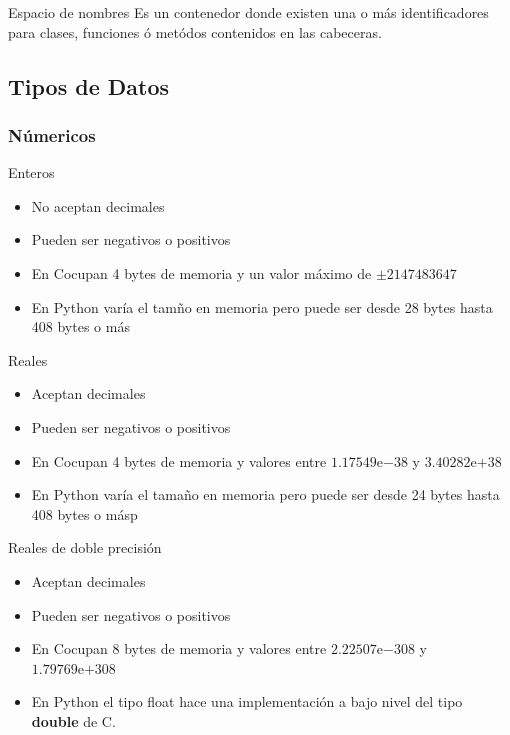 \documentclass{beamer}
\newcommand{\Rplus}{\protect\hspace{-.1em}\protect\raisebox{.35ex}{\smaller{\smaller\textbf{+}}}}
\newcommand{\Cpp}{\mbox{C\Rplus\Rplus}\hspace{3pt}}
\newcommand{\expnumber}[2]{{#1}\mathrm{e}{#2}}
\begin{document}
\begin{frame}{Espacio de nombres}
	Es un contenedor donde existen una o m\'as identificadores para clases, funciones \'o met\'odos contenidos en las cabeceras.
\end{frame}


\subsection{Tipos de Datos}

\subsubsection{N\'umericos}

\begin{frame}{Enteros}
    \begin{itemize}
        \item No aceptan decimales
        \item Pueden ser negativos o positivos
        \item En \Cpp ocupan 4 bytes de memoria y un valor m\'aximo de $\pm 2147483647$ 
        \item En Python var\'ia el tamño en memoria pero puede ser desde 28 bytes hasta 408 bytes o m\'as
    \end{itemize}
\end{frame}

\begin{frame}{Reales}
    \begin{itemize}
        \item Aceptan decimales
        \item Pueden ser negativos o positivos
        \item En \Cpp  ocupan 4 bytes de memoria y valores entre $\expnumber{1.17549}{-38}$ y $\expnumber{3.40282}{+38}$ 
        \item En Python var\'ia el tamaño en memoria pero puede ser desde 24 bytes hasta 408 bytes o m\'asp
    \end{itemize}
\end{frame}

\begin{frame}{Reales de doble precisi\'on}
    \begin{itemize}
        \item Aceptan decimales
        \item Pueden ser negativos o positivos
        \item En \Cpp  ocupan 8 bytes de memoria y valores entre $\expnumber{2.22507}{-308}$ y $\expnumber{1.79769}{+308}$ 
        \item En Python el tipo float hace una implementaci\'on a bajo nivel del tipo \textbf{double} de C.
    \end{itemize}
\end{frame}
\end{document}

